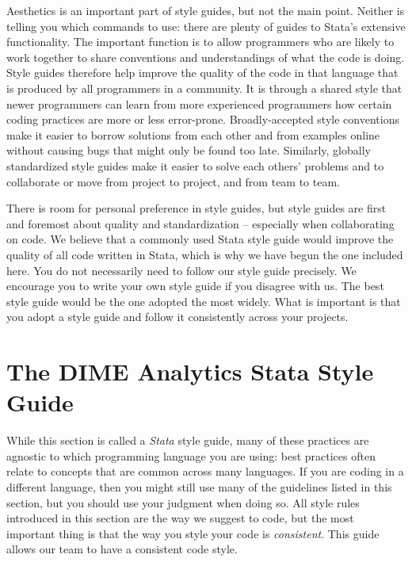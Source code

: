 Aesthetics is an important part of style guides, but not the main point.
Neither is telling you which commands to use:
there are plenty of guides to Stata's extensive functionality.
The important function is to allow programmers who are likely to work together
to share conventions and understandings of what the code is doing.
Style guides therefore help improve the quality of the code
in that language that is produced by all programmers in a community.
It is through a shared style that newer programmers can learn from more experienced programmers
how certain coding practices are more or less error-prone.
Broadly-accepted style conventions make it easier to borrow solutions
from each other and from examples online
without causing bugs that might only be found too late.
Similarly, globally standardized style guides make it easier to solve each others'
problems and to collaborate or move from project to project, and from team to team.

There is room for personal preference in style guides,
but style guides are first and foremost about quality and standardization --
especially when collaborating on code.
We believe that a commonly used Stata style guide would improve the quality of all code written in Stata,
which is why we have begun the one included here.
You do not necessarily need to follow our style guide precisely.
We encourage you to write your own style guide if you disagree with us.
The best style guide would be the one adopted the most widely.
What is important is that you adopt a style guide and follow it consistently across your projects.

\newpage

\section{The DIME Analytics Stata Style Guide}

While this section is called a \textit{Stata} style guide,
many of these practices are agnostic to which programming language you are using:
best practices often relate to concepts that are common across many languages.
If you are coding in a different language,
then you might still use many of the guidelines listed in this section,
but you should use your judgment when doing so.
All style rules introduced in this section are the way we suggest to code,
but the most important thing is that the way you style your code is \textit{consistent}.
This guide allows our team to have a consistent code style.

